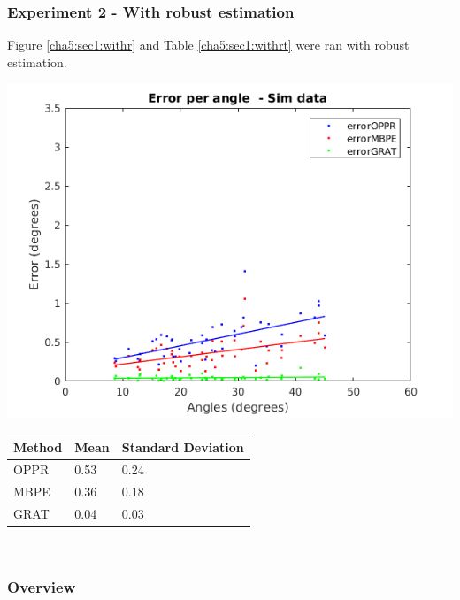 \subsubsection{Experiment 2 - With robust estimation}
Figure \ref{cha5:sec1:withr} and Table \ref{cha5:sec1:withrt} were ran with robust estimation.\\
\begin{minipage}{0.5\textwidth}
	\centering
	\includegraphics[width=\textwidth]{images/sim/withransac.png}
	\label{cha5:sec1:withr}
\end{minipage}
\begin{minipage}{0.5\textwidth}
\begin{tabular}{| l | l | l |}
	\hline
	Method & Mean & Standard Deviation \\
	\hline
	OPPR &  0.53 \degree & 0.24 \degree \\
	\hline
	MBPE &  0.36 \degree & 0.18 \degree \\
	\hline
	GRAT &  0.04 \degree & 0.03 \degree \\ 
	\hline
\end{tabular}
\label{cha5:sec1:withrt}
\end{minipage}\\

\subsubsection{Overview}

